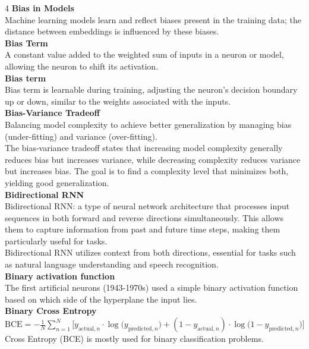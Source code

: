 \documentclass[8pt]{extarticle}
\begin{document}
\begin{multicols}{4}
\vspace{2pt}\textbf{Bias in Models}\\
Machine learning models learn and reflect biases present in the training data; the distance between embeddings is influenced by these biases.\\
\vspace{2pt}\textbf{Bias Term}\\
A constant value added to the weighted sum of inputs in a neuron or model, allowing the neuron to shift its activation.\\
\vspace{2pt}\textbf{Bias term}\\
Bias term is learnable during training, adjusting the neuron's decision boundary up or down, similar to the weights associated with the inputs.\\
\vspace{2pt}\textbf{Bias-Variance Tradeoff}\\
Balancing model complexity to achieve better generalization by managing bias (under-fitting) and variance (over-fitting).\\
The bias-variance tradeoff states that increasing model complexity generally reduces bias but increases variance, while decreasing complexity reduces variance but increases bias. The goal is to find a complexity level that minimizes both, yielding good generalization.\\
\vspace{2pt}\textbf{Bidirectional RNN}\\
Bidirectional RNN: a type of neural network architecture that processes input sequences in both forward and reverse directions simultaneously. This allows them to capture information from past and future time steps, making them particularly useful for tasks.\\
Bidirectional RNN utilizes context from both directions, essential for tasks such as natural language understanding and speech recognition.\\
\vspace{2pt}\textbf{Binary activation function}\\
The first artificial neurons (1943-1970s) used a simple binary activation function based on which side of the hyperplane the input lies.\\
\vspace{2pt}\textbf{Binary Cross Entropy}\\
$ \text{BCE} = -\frac{1}{N} \sum_{n=1}^{N} \big[ y_{\text{actual},n} \cdot \log\big(y_{\text{predicted},n}\big) + (1 - y_{\text{actual},n}) \cdot \log\big(1 - y_{\text{predicted},n}\big) \big] $\Binary Cross Entropy (BCE) is mostly used for binary classification problems.\\

\end{multicols}
\end{document}
